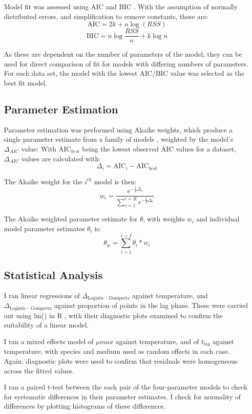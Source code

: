 \documentclass[11pt, a4paper]{article}
\begin{document}
\begin{linenumbers}
Model fit was assessed using AIC \cite{AIC} and BIC \cite{BIC}. With the assumption of normally distributed errors, and simplification to remove constants, these are:
\[\text {AIC}  = 2k + n\log(RSS)\]
\[\text {BIC} = n\log{\frac{RSS}{n}} + k\log{n}\]

As these are dependent on the number of parameters of the model, they can be used for direct comparison of fit for models with differing numbers of parameters. For each data set, the model with the lowest AIC/BIC value was selected as the best fit model.


\subsection{Parameter Estimation}

Parameter estimation was performed using Akaike weights, which produce a single parameter estimate from a family of models \cite{ModelSelection}, weighted by the model’s $\Delta_{AIC}$ value:
With $\text{AIC}_{best}$ being the lowest observed AIC values for a dataset, $\Delta_{AIC}$ values are calculated with:
\[ \Delta_i = \text{AIC}_i - \text{AIC}_{best} \]

The Akaike weight for the $i^{th}$ model is then:
\[ w_i = \frac{e^{-\frac{1}{2}\Delta_i }} { \sum_{r = 1}^{r = R}  e^{- \frac{1}{2}\Delta_r }}\]

The Akaike weighted parameter estimate for $\theta$, with weights $w_i$ and individual model parameter estimates $\theta_i$ is:
\[\theta_w = \sum_{i = 1}^{i = I}\theta_i * w_i\]


\subsection{Statistical Analysis}

I ran linear regressions of $\Delta_{\text{Logistic - Gompertz}}$ against temperature, and $\Delta_{\text{Logistic - Gompertz}}$ against proportion of points in the lag phase. These were carried out using lm() in R \cite{R}, with their diagnostic plots examined to confirm the suitability of a linear model.

I ran a mixed effects model of $\mu{max}$ against temperature, and of $t_{lag}$ against temperature, with species and medium used as random effects in each case. Again, diagnostic plots were used to confirm that residuals were homogeneous across the fitted values.

I ran a paired t-test between the each pair of the four-parameter models to check for systematic differences in their parameter estimates. I check for normality of differences by plotting histograms of these differences.  


\end{linenumbers}
\end{document}
